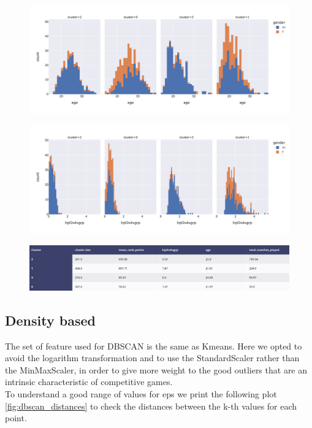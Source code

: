 \documentclass{article}
\begin{document}
\begin{figure}
\centering
\begin{minipage}{.5\textwidth}
\centering
\includegraphics[width=\textwidth]{age_kmeans}
\label{fig:age_kmeans}
\end{minipage}%
\begin{minipage}{.5\textwidth}
\centering
\includegraphics[width=\textwidth]{lrpOnAvgrp_kmeans}
\label{fig:lrpOnAvgrp_kmeans}
\end{minipage}
\end{figure}

\begin{figure}[h]
\centering
\includegraphics[width=.6\textwidth]{kmeans_results}
\label{fig:kmeans_results}
\end{figure}

\newpage
\subsection{Density based}
The set of feature used for DBSCAN is the same as Kmeans. Here we opted to avoid the logarithm transformation and to use the StandardScaler rather than the MinMaxScaler, in order to give more weight to the good outliers that are an intrinsic characteristic of competitive games.\\
To understand a good range of values for eps we print the following plot \ref{fig:dbscan_distances} to check the distances between the k-th values for each point.
\end{document}
